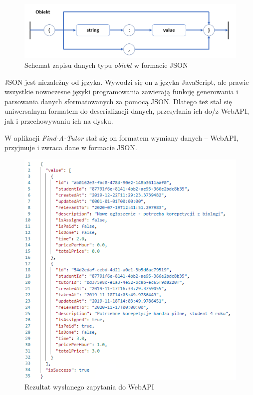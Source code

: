 \documentclass[12pt]{article}
\numberwithin{figure}{section}
\begin{document}
\begin{sloppypar}
        \begin{figure}[H] 
         	\centering
        	\includegraphics[width=1.0\textwidth]{images/chapter_3/json.png}
        	\caption{Schemat zapisu danych typu \textit{obiekt} w formacie JSON}
        	\label{fig:json}
        \end{figure}
        
        JSON jest niezależny od języka. Wywodzi się on z języka JavaScript, ale prawie wszystkie nowoczesne języki programowania zawierają funkcję generowania i parsowania danych sformatowanych za pomocą JSON. Dlatego też stał się uniwersalnym formatem do deserializacji danych, przesyłania ich do/z WebAPI, jak i przechowywaniu ich na dysku.
        
        W aplikacji \textit{Find-A-Tutor} stał się on formatem wymiany danych -- WebAPI, przyjmuje i zwraca dane w formacie JSON. 
        
        \begin{figure}[H] 
         	\centering
        	\includegraphics[width=.9\textwidth]{images/chapter_3/json-get.png}
        	\caption{Rezultat wysłanego zapytania do WebAPI}
        	\label{fig:json-get}
        \end{figure}
        

\end{sloppypar}
\end{document}
